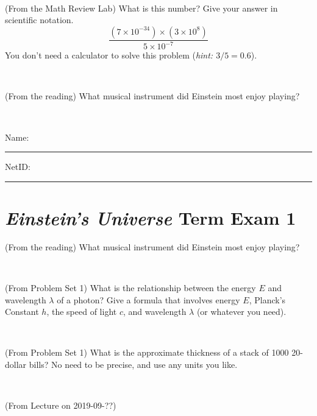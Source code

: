\documentclass[12pt, letterpaper]{article}
\begin{document}
\vfill ~

\begin{problem} (From the Math Review Lab)
What is this number? Give your answer in scientific notation.
$$
\frac{(7\times10^{-34})\times(3\times10^8)}{5\times10^{-7}}
$$
You don't need a calculator to solve this problem (\textit{hint: $3/5=0.6$}).
\end{problem}


\vfill ~

\begin{problem} (From the reading)
What musical instrument did Einstein most enjoy playing?
\end{problem}


\vfill ~


\cleardoublepage



\noindent
Name: \rule[-1ex]{0.60\textwidth}{0.1pt}
NetID: \rule[-1ex]{0.20\textwidth}{0.1pt}

\section*{\textsl{Einstein's Universe} Term Exam 1}
\setcounter{problem}{1}


\begin{problem} (From the reading)
What musical instrument did Einstein most enjoy playing?
\end{problem}


\vfill ~

\begin{problem} (From Problem Set 1)
What is the relationship between the energy $E$ and wavelength
$\lambda$ of a photon? Give a formula that involves energy $E$,
Planck's Constant $h$, the speed of light $c$, and wavelength
$\lambda$ (or whatever you need).
\end{problem}

\vfill ~

\begin{problem} (From Problem Set 1)
What is the approximate thickness of a stack of 1000 20-dollar bills?
No need to be precise, and use any units you like.
\end{problem}


\vfill ~

\begin{problem} (From Lecture on 2019-09-??)
\end{problem}


\vfill ~


\clearpage
\end{document}
